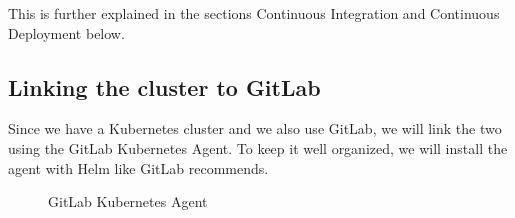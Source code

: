 This is further explained in the sections Continuous Integration and Continuous Deployment below.

\subsection{Linking the cluster to GitLab}
Since we have a Kubernetes cluster and we also use GitLab, we will link the two using the GitLab Kubernetes Agent.
To keep it well organized, we will install the agent with Helm like GitLab recommends.

\begin{figure}[H]
    \centering
    \caption{GitLab Kubernetes Agent}
    \label{fig:gitlab-kubernetes-agent}
\end{figure}

